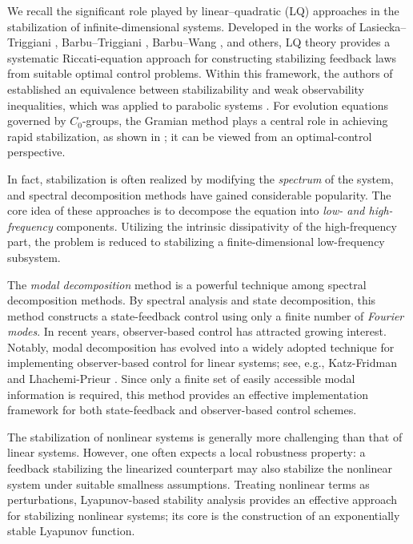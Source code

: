 \documentclass[a4paper]{article}
\numberwithin{equation}{section}
\begin{document}
We recall the significant role played by linear--quadratic (LQ) approaches in the stabilization of infinite-dimensional systems. Developed in the works of Lasiecka--Triggiani \cite{LT}, Barbu--Triggiani \cite{BT}, Barbu--Wang \cite{BW}, and others, LQ theory provides a systematic Riccati-equation approach for constructing stabilizing feedback laws from suitable optimal control problems. Within this framework, the authors of \cite{TWX} established an equivalence between stabilizability and weak observability inequalities, which was applied to parabolic systems \cite{HWW}. For evolution equations governed by $C_0$-groups, the Gramian method plays a central role in achieving rapid stabilization, as shown in \cite{Ur}; it can be viewed from an optimal-control perspective.

In fact, stabilization is often realized by modifying the \textit{spectrum} of the system, and spectral decomposition methods \cite{BT,CT1,X} have gained considerable popularity. The core idea of these approaches is to decompose the equation into \textit{low- and high-frequency} components. Utilizing the intrinsic dissipativity of the high-frequency part, the problem is reduced to stabilizing a finite-dimensional low-frequency subsystem.
\vspace{1mm}

The \textit{modal decomposition} method is a powerful technique among spectral decomposition methods. By spectral analysis and state decomposition, this method constructs a state-feedback control using only a finite number of \textit{Fourier modes}. In recent years, observer-based control has attracted growing interest. Notably, modal decomposition has evolved into a widely adopted technique for implementing observer-based control for linear systems; see, e.g., Katz-Fridman \cite{KF} and Lhachemi-Prieur \cite{LP1}. Since only a finite set of easily accessible modal information is required, this method provides an effective implementation framework for both state-feedback and observer-based control schemes.
\vspace{1mm}

The stabilization of nonlinear systems is generally more challenging than that of linear systems. However, one often expects a local robustness property: a feedback stabilizing the
linearized counterpart may also stabilize the nonlinear system under suitable smallness assumptions. Treating nonlinear terms as perturbations, Lyapunov-based stability analysis provides an effective approach for stabilizing nonlinear systems; its core is the construction of an exponentially stable Lyapunov function.
\end{document}
